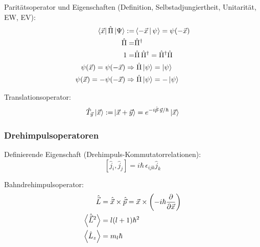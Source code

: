 \documentclass[11pt]{article}
\numberwithin{equation}{section}
\begin{document}
      Paritätsoperator und Eigenschaften (Definition, Selbstadjungiertheit, Unitarität, EW, EV):
      \begin{equation}
        \begin{aligned}
          \Bra{\vec{x}} \hat{\Pi} \Ket{\Psi} :=& \Braket{-\vec{x} | \psi} = \psi(-\vec{x}) \\
          \hat{\Pi} =& \hat{\Pi}^\dagger\\
          1 =& \hat{\Pi} \,\hat{\Pi}^\dagger = \hat{\Pi}^\dagger \hat{\Pi} \\
          \psi(\vec{x}) = \psi(-\vec{x}) \Rightarrow&\; \hat{\Pi}\Ket{\psi} = \Ket{\psi} \\
          \psi(\vec{x}) = -\psi(-\vec{x}) \Rightarrow&\; \hat{\Pi}\Ket{\psi} = -\Ket{\psi} \\
        \end{aligned}
      \end{equation}

      Translationsoperator:
      \begin{equation}
        \begin{aligned}
          \hat{T}_{\vec{y}}\Ket{\vec{x}} :=& \Ket{\vec{x} + \vec{y}} = e^{-i\hat{\vec{p}}\cdot\vec{y}/\hbar}\Ket{\vec{x}} \\
        \end{aligned}
      \end{equation}

    \subsubsection{Drehimpulsoperatoren}
      Definierende Eigenschaft (Drehimpuls-Kommutatorrelationen):
      \begin{equation}
        \left[ \hat{j}_i, \hat{j}_j \right] = i\hbar\, \epsilon_{ijk} \hat{j}_k
      \end{equation}

      Bahndrehimpulsoperator:
      \begin{equation}
        \begin{aligned}
          \hat{\vec{L}} &= \hat{\vec{x}}\times \hat{\vec{p}} = \vec{x}\times\left(-i\hbar\frac{\partial }{\partial \vec{x}}\right)  \\
          \left< \hat{\vec{L}}^2 \right> &= l(l+1)\hbar^2 \\
          \left< \hat{L}_z \right> &= m_l \hbar \\
        \end{aligned}
      \end{equation}
\end{document}
